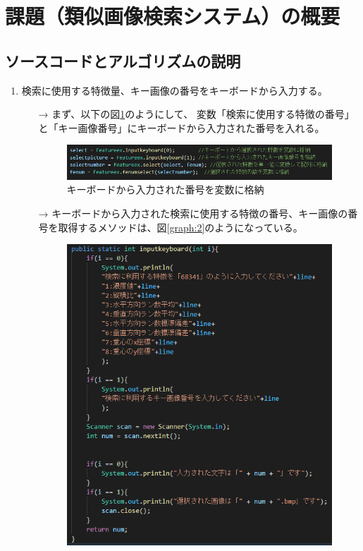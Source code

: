 \section{課題（類似画像検索システム）の概要}
\subsection{ソースコードとアルゴリズムの説明}
\begin{enumerate}
  \item 検索に使用する特徴量、キー画像の番号をキーボードから入力する。
  \begin{itemize}
    \item[→] まず、以下の図\ref{graph:1}のようにして、
    変数「検索に使用する特徴の番号」と「キー画像番号」にキーボードから入力された番号を入れる。
    \begin{figure}[htbp]
      \begin{minipage}[t]{\hsize}
        \includegraphics[scale=0.4]{キー画像入力.PNG}
        \centering
        \caption{キーボードから入力された番号を変数に格納}
        \label{graph:1}
      \end{minipage}
    \end{figure}
    \item[→] キーボードから入力された検索に使用する特徴の番号、キー画像の番号を取得するメソッドは、図\ref{graph:2}のようになっている。
    \begin{figure}[htbp]
      \begin{minipage}[t]{\hsize}
        \includegraphics[scale=0.4]{キー画像入力1.PNG}

\end{minipage}
\end{figure}
\end{itemize}
\end{enumerate}
